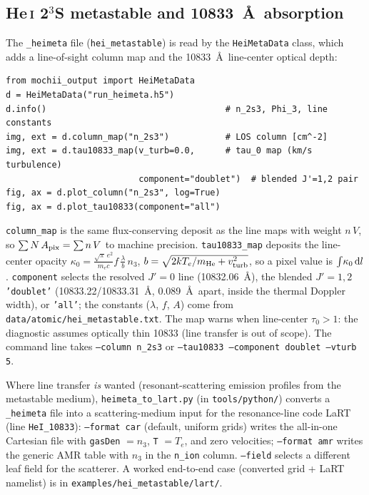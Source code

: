 \documentclass[english,a4paper]{my_memo}
\newcommand{\code}[1]{\texttt{#1}}
\begin{document}
\subsection{He\,\textsc{i} 2$^3$S metastable and 10833~\AA\ absorption}
The \code{\_heimeta} file (\code{hei\_metastable}) is read by the
\code{HeiMetaData} class, which adds a line-of-sight column map and the
10833~\AA\ line-center optical depth:
\begin{verbatim}
from mochii_output import HeiMetaData
d = HeiMetaData("run_heimeta.h5")
d.info()                                   # n_2s3, Phi_3, line constants
img, ext = d.column_map("n_2s3")           # LOS column [cm^-2]
img, ext = d.tau10833_map(v_turb=0.0,      # tau_0 map (km/s turbulence)
                          component="doublet")  # blended J'=1,2 pair
fig, ax = d.plot_column("n_2s3", log=True)
fig, ax = d.plot_tau10833(component="all")
\end{verbatim}
\code{column\_map} is the same flux-conserving deposit as the line maps
with weight $n\,V$, so $\sum N\,A_{\rm pix} = \sum n\,V$ to machine
precision.  \code{tau10833\_map} deposits the line-center opacity
$\kappa_0 = \frac{\sqrt{\pi}\,e^2}{m_e c} f\,\frac{\lambda}{b}\,n_3$,
$b = \sqrt{2 k T_e/m_{\rm He} + v_{\rm turb}^2}$, so a pixel value is
$\int\!\kappa_0\,{\rm d}l$.  \code{component} selects the resolved
$J'=0$ line (10832.06~\AA), the blended $J'=1,2$ \code{'doublet'}
(10833.22/10833.31~\AA, 0.089~\AA\ apart, inside the thermal Doppler
width), or \code{'all'}; the constants ($\lambda$, $f$, $A$) come from
\code{data/atomic/hei\_metastable.txt}.  The map warns when line-center
$\tau_0 > 1$: the diagnostic assumes optically thin 10833 (line transfer
is out of scope).  The command line takes \code{--column n\_2s3} or
\code{--tau10833 --component doublet --vturb 5}.

Where line transfer \emph{is} wanted (resonant-scattering emission
profiles from the metastable medium), \code{heimeta\_to\_lart.py} (in
\code{tools/python/}) converts a \code{\_heimeta} file into a
scattering-medium input for the resonance-line code LaRT (line
\code{HeI\_10833}): \code{--format car}
(default, uniform grids) writes the all-in-one Cartesian file with
\code{gasDen} $= n_3$, \code{T} $= T_e$, and zero velocities;
\code{--format amr} writes the generic AMR table with $n_3$ in the
\code{n\_ion} column.  \code{--field} selects a different leaf field for
the scatterer.  A worked end-to-end case (converted grid + LaRT namelist)
is in \code{examples/hei\_metastable/lart/}.
\end{document}
